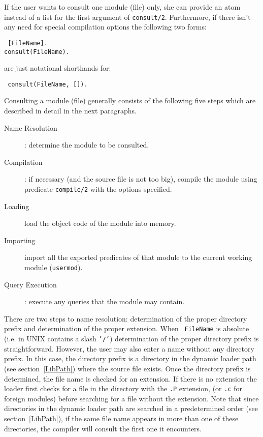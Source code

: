 If the user wants to consult one module (file) only, she can provide an
atom instead of a list for the first argument of {\tt consult/2}.
Furthermore, if there isn't any need for special compilation options the
following two forms:
\begin{center}{\tt
	    [FileName]. \\
	consult(FileName).
}\end{center}
are just notational shorthands for:
\begin{center}{\tt
	consult(FileName, []).
}\end{center}

Consulting a module (file) generally consists of the following five
steps which are described in detail in the next paragraphs.
\begin{description}
\item[Name Resolution]: determine the module to be consulted.
\item[Compilation]:  if necessary (and the source file is not too big),
      compile the module using predicate {\tt compile/2} with the options
      specified.
\item[Loading] load the object code of the module into memory.
\item[Importing] import all the exported predicates of that module to
      the current working module ({\tt usermod}).
\item[Query Execution]: execute any queries that the module may contain.
\end{description}

There are two steps to name resolution: determination of the proper
directory prefix and determination of the proper extension.  When {\tt
FileName} is absolute (i.e. in UNIX contains a slash {\tt '/'})
determination of the proper directory prefix is straightforward.
However, the user may also enter a name without any directory
prefix. In this case, the directory prefix is a directory in the
dynamic loader path (see section~\ref{LibPath}) where the source file
exists.  Once the directory prefix is determined, the file name is
checked for an extension.  If there is no extension the loader first
checks for a file in the directory with the {\tt .P} extension, (or
{\tt .c} for foreign modules) before searching for a file without the
extension.  Note that since directories in the dynamic loader path are
searched in a predetermined order (see section~\ref{LibPath}), if the
same file name appears in more than one of these directories, the
compiler will consult the first one it encounters.

